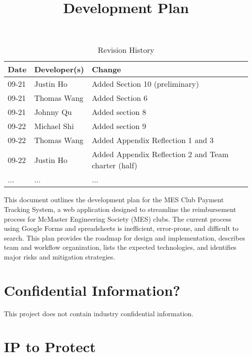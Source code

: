 \documentclass{article}
\title{Development Plan\\\progname}
\author{\authname}
\date{}
\begin{document}
\maketitle

\begin{table}[hp]
\caption{Revision History} \label{TblRevisionHistory}
\begin{tabularx}{\textwidth}{llX}
\toprule
\textbf{Date} & \textbf{Developer(s)} & \textbf{Change}\\
\midrule
09-21 & Justin Ho & Added Section 10 (preliminary)\\
09-21 & Thomas Wang & Added Section 6\\
09-21 & Johnny Qu & Added section 8\\
09-22 & Michael Shi & Added section 9\\
09-22 & Thomas Wang & Added Appendix Reflection 1 and 3\\
09-22 & Justin Ho & Added Appendix Reflection 2 and Team charter (half)\\
... & ... & ...\\
\bottomrule
\end{tabularx}
\end{table}

\newpage{}

This document outlines the development plan for the MES Club Payment Tracking System, a web application designed to streamline the reimbursement process for McMaster Engineering Society (MES) clubs. The current process using Google Forms and spreadsheets is inefficient, error-prone, and difficult to search. This plan provides the roadmap for design and implementation, describes team and workflow organization, lists the expected technologies, and identifies major risks and mitigation strategies.


\section{Confidential Information?}

This project does not contain industry confidential information.

\section{IP to Protect}
\end{document}
